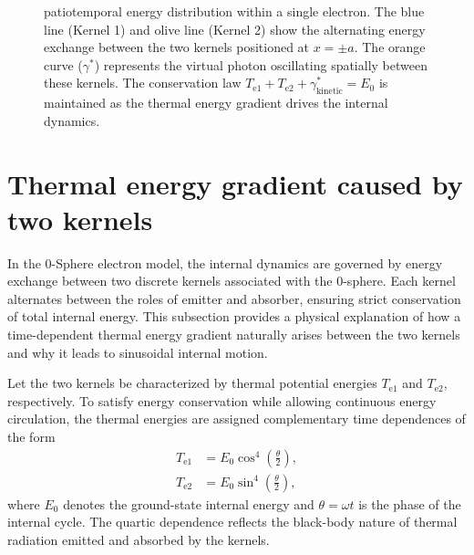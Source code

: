 \documentclass[%
 reprint,
 amsmath,amssymb,
 aps,
 prb,
]{revtex4-2}
\numberwithin{equation}{section}
\begin{document}
\begin{figure}[t!]
    \centering
    \resizebox{0.95\columnwidth}{!}{%
    }
    \caption{\justifying patiotemporal energy distribution within a single electron. The blue line (Kernel 1) and olive line (Kernel 2) show the alternating energy exchange between the two kernels positioned at $x = \pm a$. The orange curve ($\gamma^*$) represents the virtual photon oscillating spatially between these kernels. The conservation law $T_{\mathrm{e1}} + T_{\mathrm{e2}} + \gamma^*_{\mathrm{kinetic}} = E_0$ is maintained as the thermal energy gradient drives the internal dynamics.
    }
    \label{fig:appendix_virtual_photon}
\end{figure}


\section{Thermal energy gradient caused by two kernels}
\label{sec:thermal_energy_gradient}

In the 0-Sphere electron model, the internal dynamics are governed by energy exchange between two discrete kernels associated with the 0-sphere.
Each kernel alternates between the roles of emitter and absorber, ensuring strict conservation of total internal energy.
This subsection provides a physical explanation of how a time-dependent thermal energy gradient naturally arises between the two kernels and why it leads to sinusoidal internal motion.

Let the two kernels be characterized by thermal potential energies $T_{\mathrm{e1}}$ and $T_{\mathrm{e2}}$, respectively.
To satisfy energy conservation while allowing continuous energy circulation, the thermal energies are assigned complementary time dependences of the form
\begin{equation}
\begin{split}
T_{\mathrm{e1}} &= E_0 \cos^4\!\left(\frac{\theta}{2}\right), \\
T_{\mathrm{e2}} &= E_0 \sin^4\!\left(\frac{\theta}{2}\right),
\end{split}
\label{eq:kernel_temperatures}
\end{equation}
where $E_0$ denotes the ground-state internal energy and $\theta=\omega t$ is the phase of the internal cycle.
The quartic dependence reflects the black-body nature of thermal radiation emitted and absorbed by the kernels.
\end{document}
